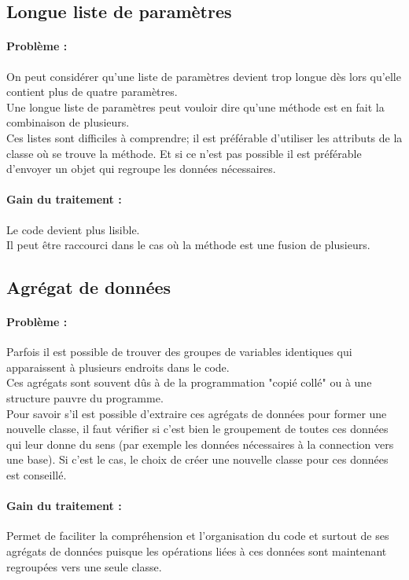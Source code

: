 \documentclass[a4paper,twoside,12pt,openright]{report}
\begin{document}
\subsection{Longue liste de paramètres}
\paragraph{Problème :}
On peut considérer qu'une liste de paramètres devient trop longue dès lors qu'elle contient plus de quatre paramètres.\\
Une longue liste de paramètres peut vouloir dire qu'une méthode est en fait la combinaison de plusieurs.\\
Ces listes sont difficiles à comprendre; il est préférable d'utiliser les attributs de la classe où se trouve la méthode. Et si ce n'est pas possible il est préférable d'envoyer un objet qui regroupe les données nécessaires.\\

\paragraph{Gain du traitement :}
Le code devient plus lisible.\\
Il peut être raccourci dans le cas où la méthode est une fusion de plusieurs.\\

\subsection{Agrégat de données}
\paragraph{Problème :}
Parfois il est possible de trouver des groupes de variables identiques qui apparaissent à plusieurs endroits dans le code.\\
Ces agrégats sont souvent dûs à de la programmation "copié collé" ou à une structure pauvre du programme.\\
Pour savoir s'il est possible d'extraire ces agrégats de données pour former une nouvelle classe, il faut vérifier si c'est bien le groupement de toutes ces données qui leur donne du sens (par exemple les données nécessaires à la connection vers une base). Si c'est le cas, le choix de créer une nouvelle classe pour ces données est conseillé.\\

\paragraph{Gain du traitement :}
Permet de faciliter la compréhension et l'organisation du code et surtout de ses agrégats de données puisque les opérations liées à ces données sont maintenant regroupées vers une seule classe.\\
\end{document}
